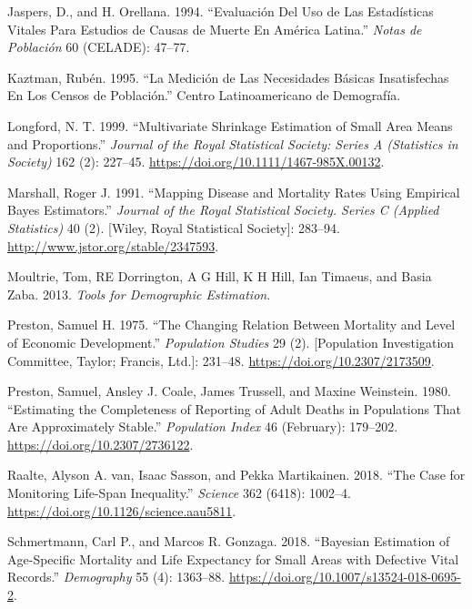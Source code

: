 \documentclass[12pt,]{article}
\begin{document}
\leavevmode\hypertarget{ref-JaspersOrellana1994}{}%
Jaspers, D., and H. Orellana. 1994. ``Evaluación Del Uso de Las
Estadísticas Vitales Para Estudios de Causas de Muerte En América
Latina.'' \emph{Notas de Población} 60 (CELADE): 47--77.

\leavevmode\hypertarget{ref-Kaztman1995}{}%
Kaztman, Rubén. 1995. ``La Medición de Las Necesidades Básicas
Insatisfechas En Los Censos de Población.'' Centro Latinoamericano de
Demografía.

\leavevmode\hypertarget{ref-Longford1999}{}%
Longford, N. T. 1999. ``Multivariate Shrinkage Estimation of Small Area
Means and Proportions.'' \emph{Journal of the Royal Statistical Society:
Series A (Statistics in Society)} 162 (2): 227--45.
\url{https://doi.org/10.1111/1467-985X.00132}.

\leavevmode\hypertarget{ref-Marshall1991}{}%
Marshall, Roger J. 1991. ``Mapping Disease and Mortality Rates Using
Empirical Bayes Estimators.'' \emph{Journal of the Royal Statistical
Society. Series C (Applied Statistics)} 40 (2). {[}Wiley, Royal
Statistical Society{]}: 283--94.
\url{http://www.jstor.org/stable/2347593}.

\leavevmode\hypertarget{ref-Moultrie}{}%
Moultrie, Tom, RE Dorrington, A G Hill, K H Hill, Ian Timaeus, and Basia
Zaba. 2013. \emph{Tools for Demographic Estimation}.

\leavevmode\hypertarget{ref-Preston_1975}{}%
Preston, Samuel H. 1975. ``The Changing Relation Between Mortality and
Level of Economic Development.'' \emph{Population Studies} 29 (2).
{[}Population Investigation Committee, Taylor; Francis, Ltd.{]}:
231--48. \url{https://doi.org/10.2307/2173509}.

\leavevmode\hypertarget{ref-Preston1980}{}%
Preston, Samuel, Ansley J. Coale, James Trussell, and Maxine Weinstein.
1980. ``Estimating the Completeness of Reporting of Adult Deaths in
Populations That Are Approximately Stable.'' \emph{Population Index} 46
(February): 179--202. \url{https://doi.org/10.2307/2736122}.

\leavevmode\hypertarget{ref-vanRaalte_Sasson_Martikainen_2018}{}%
Raalte, Alyson A. van, Isaac Sasson, and Pekka Martikainen. 2018. ``The
Case for Monitoring Life-Span Inequality.'' \emph{Science} 362 (6418):
1002--4. \url{https://doi.org/10.1126/science.aau5811}.

\leavevmode\hypertarget{ref-Schmertmann2018}{}%
Schmertmann, Carl P., and Marcos R. Gonzaga. 2018. ``Bayesian Estimation
of Age-Specific Mortality and Life Expectancy for Small Areas with
Defective Vital Records.'' \emph{Demography} 55 (4): 1363--88.
\url{https://doi.org/10.1007/s13524-018-0695-2}.
\end{document}

